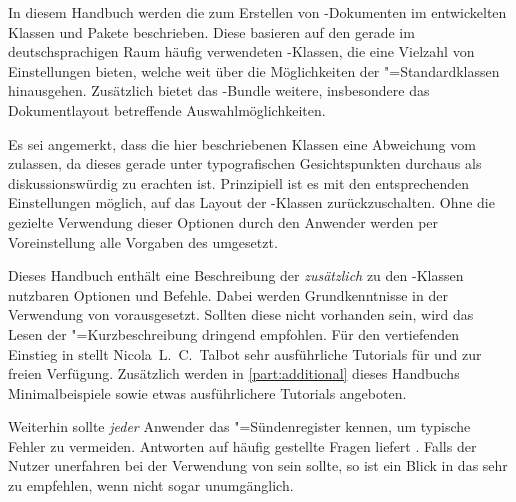 \addchap[tocentry={}]{\prefacename}
In diesem Handbuch werden die zum Erstellen von -Dokumenten 
im  entwickelten Klassen und Pakete 
beschrieben. Diese basieren auf den gerade im deutschsprachigen Raum häufig 
verwendeten \KOMAScript-Klassen, die eine Vielzahl von Einstellungen bieten, 
welche weit über die Möglichkeiten der "=Standardklassen 
hinausgehen. Zusätzlich bietet das \TUDScript-Bundle weitere, insbesondere das 
Dokumentlayout betreffende Auswahlmöglichkeiten.

Es sei angemerkt, dass die hier beschriebenen Klassen eine Abweichung vom 
\TUDCD zulassen, da dieses gerade unter typografischen Gesichtspunkten 
durchaus als diskussionswürdig zu erachten ist. Prinzipiell ist es mit den 
entsprechenden Einstellungen möglich, auf das Layout der \KOMAScript-Klassen 
zurückzuschalten. Ohne die gezielte Verwendung dieser Optionen durch den 
Anwender werden per Voreinstellung alle Vorgaben des \CDs umgesetzt.

Dieses Handbuch enthält eine Beschreibung der \emph{zusätzlich} zu den 
\KOMAScript-Klassen nutzbaren Optionen und Befehle. Dabei werden 
Grundkenntnisse in der Verwendung von  vorausgesetzt. Sollten 
diese nicht vorhanden sein, wird das Lesen der 
"=Kurzbeschreibung
dringend empfohlen. Für den vertiefenden Einstieg in  stellt 
Nicola~L.~C.~Talbot sehr ausführliche Tutorials für 
und  zur 
freien Verfügung. Zusätzlich werden in \autoref{part:additional} dieses 
Handbuchs Minimalbeispiele sowie etwas ausführlichere Tutorials angeboten.

Weiterhin sollte \emph{jeder} Anwender das "=Sündenregister 
kennen, um typische Fehler zu vermeiden. Antworten auf häufig gestellte Fragen 
liefert . Falls der 
Nutzer unerfahren bei der Verwendung von \KOMAScript sein sollte, so ist ein 
Blick in das  sehr zu empfehlen, wenn nicht 
sogar unumgänglich.


